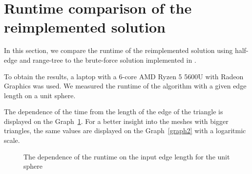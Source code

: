 \section{Runtime comparison of the reimplemented solution}
\label{sub4.3}
In this section, we compare the runtime of the reimplemented solution using half-edge 
and range-tree to the brute-force solution implemented in \cite{korecova2021triangulation}.

To obtain the results, a laptop with a 6-core AMD Ryzen 5 5600U with Radeon Graphics was used.
We measured the runtime of the algorithm with a given edge length on a unit sphere.

The dependence of the time from the length of the edge of the triangle is
displayed on the Graph~\ref{graph1}.
For a better insight into the meshes with bigger triangles, the same values are 
displayed on the Graph~\ref{graph2} with a logaritmic scale.

\renewcommand{\figurename}{Graph}
\begin{figure}
    \centering
{}
\caption[The dependence of the runtime on the input edge length for the unit sphere]
{The dependence of the runtime on the input edge length for the unit sphere}
\label{graph1}
\end{figure}

